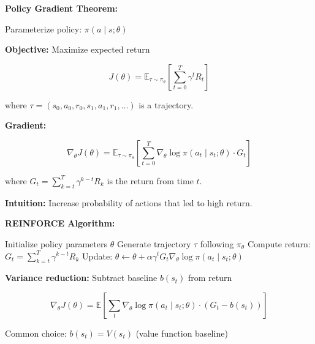 \begin{seanbox}{5.8}
\textbf{Policy Gradient Theorem:}

Parameterize policy: $\pi(a \mid s; \theta)$

\textbf{Objective:} Maximize expected return

\begin{equation}
    J(\theta) = \mathbb{E}_{\tau \sim \pi_\theta} \left[ \sum_{t=0}^T \gamma^t R_t \right]
\end{equation}

where $\tau = (s_0, a_0, r_0, s_1, a_1, r_1, \ldots)$ is a trajectory.

\textbf{Gradient:}

\begin{equation}
    \nabla_\theta J(\theta) = \mathbb{E}_{\tau \sim \pi_\theta} \left[ \sum_{t=0}^T \nabla_\theta \log \pi(a_t \mid s_t; \theta) \cdot G_t \right]
\end{equation}

where $G_t = \sum_{k=t}^T \gamma^{k-t} R_k$ is the return from time $t$.

\textbf{Intuition:} Increase probability of actions that led to high return.

\textbf{REINFORCE Algorithm:}

\begin{algorithmic}[1]
\State Initialize policy parameters $\theta$
    \State Generate trajectory $\tau$ following $\pi_\theta$
        \State Compute return: $G_t = \sum_{k=t}^T \gamma^{k-t} R_k$
        \State Update: $\theta \leftarrow \theta + \alpha \gamma^t G_t \nabla_\theta \log \pi(a_t \mid s_t; \theta)$
    \EndFor
\EndFor
\end{algorithmic}

\textbf{Variance reduction:} Subtract baseline $b(s_t)$ from return

\begin{equation}
    \nabla_\theta J(\theta) = \mathbb{E} \left[ \sum_t \nabla_\theta \log \pi(a_t \mid s_t; \theta) \cdot (G_t - b(s_t)) \right]
\end{equation}

Common choice: $b(s_t) = V(s_t)$ (value function baseline)
\end{seanbox}

